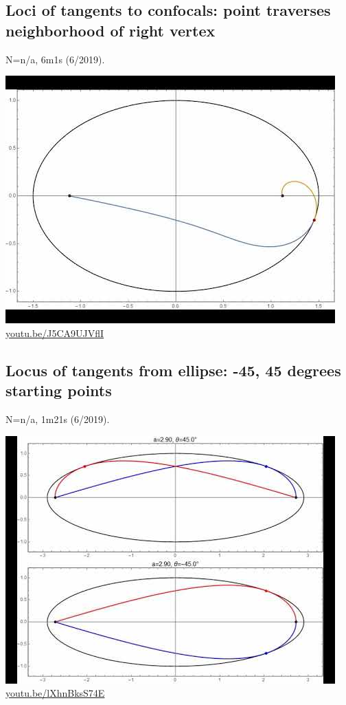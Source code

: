 \documentclass[12pt]{amsart}
\begin{document}
\subsection{Loci of tangents to confocals: point traverses neighborhood of right vertex}
\label{vid:J5CA9UJVflI}
\noindent N=n/a, 6m1s (6/2019). 
\begin{center}\includegraphics[width=.5\textwidth]{pics/J5CA9UJVflI.jpg} \\ 
\href{https://youtu.be/J5CA9UJVflI}{\url{youtu.be/J5CA9UJVflI}}\end{center}
% 

\subsection{Locus of tangents from ellipse: -45, 45 degrees starting points}
\label{vid:lXhnBksS74E}
\noindent N=n/a, 1m21s (6/2019). 
\begin{center}\includegraphics[width=.5\textwidth]{pics/lXhnBksS74E.jpg} \\ 
\href{https://youtu.be/lXhnBksS74E}{\url{youtu.be/lXhnBksS74E}}\end{center}
% 
\end{document}
